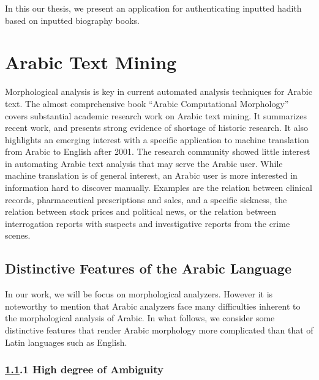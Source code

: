 \documentclass[a4,12pt]{report}
\begin{document}
In this our thesis, we present an application
for authenticating inputted hadith based on inputted biography books.

\section{Arabic Text Mining}

Morphological analysis is key in current automated 
analysis techniques for Arabic text.
The almost comprehensive book 
``Arabic Computational Morphology''~\cite{Sou07}
covers substantial academic research work on Arabic text mining.
It summarizes recent work, and presents strong evidence of 
shortage of historic research. It also highlights  an emerging 
interest with a specific application to machine 
translation from Arabic to English after 2001.
The research community showed little interest in 
automating Arabic text analysis that may serve
the Arabic user.
While machine translation is of general interest, 
an Arabic user is more interested in 
information hard to discover manually.
Examples are the relation between clinical records, pharmaceutical 
prescriptions and sales, and a specific sickness,
the relation
between stock prices and political news, or the 
relation between interrogation reports with suspects
and investigative reports from the crime scenes.

\subsection{Distinctive Features of the Arabic Language}
\label{sec:ArabicDistinctive}

In our work, we will be focus on morphological analyzers. 
However it is noteworthy to mention that 
Arabic analyzers face many difficulties
inherent to the morphological analysis of Arabic. 
In what follows, we consider some distinctive features that
render Arabic morphology more complicated than that of Latin languages
such as English.

\subsubsection{\ref*{sec:ArabicDistinctive}.1 High degree of Ambiguity}
\end{document}
